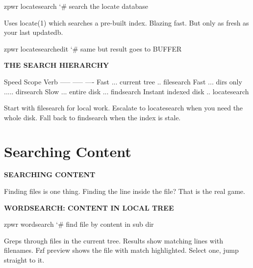 \documentclass[11pt,a4paper,twoside]{book}
\begin{document}
\begin{codebox}
\color{neongreen}zpwr locatesearch        {\char`\#} search the locate database\\
\end{codebox}

Uses locate(1) which searches a pre-built index. Blazing fast. But only as fresh as your last updatedb.

\begin{codebox}
\color{neongreen}zpwr locatesearchedit    {\char`\#} same but result goes to BUFFER\\
\end{codebox}


\vspace{12pt}
{\bfseries\color{neonyellow} THE SEARCH HIERARCHY}\vspace{4pt}

Speed    Scope          Verb -----    -----          ---- Fast ... current tree .. filesearch Fast ... dirs only ..... dirsearch Slow ... entire disk ... findsearch Instant  indexed disk .. locatesearch

Start with filesearch for local work. Escalate to locatesearch when you need the whole disk. Fall back to findsearch when the index is stale.


\vspace{16pt}

\section{Searching Content}


\vspace{10pt}
{\large\bfseries\color{neoncyan} SEARCHING CONTENT}\vspace{6pt}

Finding files is one thing. Finding the line inside the file? That is the real game.


\vspace{12pt}
{\bfseries\color{neonyellow} WORDSEARCH: CONTENT IN LOCAL TREE}\vspace{4pt}

\begin{codebox}
\color{neongreen}zpwr wordsearch          {\char`\#} find file by content in sub dir\\
\end{codebox}

Greps through files in the current tree. Results show matching lines with filenames. Fzf preview shows the file with match highlighted. Select one, jump straight to it.
\end{document}
